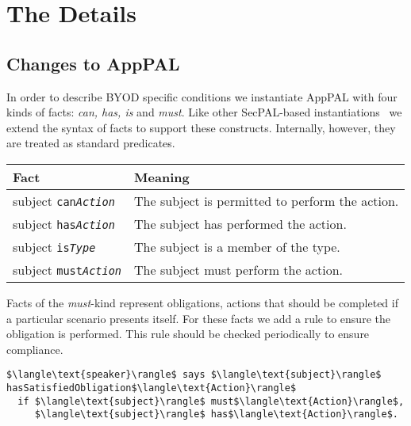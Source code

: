 \documentclass{article}
\begin{document}
\section{The Details}
\label{sec:details}

\subsection{Changes to AppPAL}

In order to describe BYOD specific conditions we instantiate AppPAL with four kinds of facts: \emph{can, has, is} and \emph{must}.
Like other SecPAL-based instantiations~\cite{becker_framework_2009,aziz_secpal4dsa:_2011} we extend the syntax of facts to support these constructs.
Internally, however, they are treated as standard predicates.

\begin{center}
  \footnotesize\sffamily
  \newcommand{\predicate}[3]{#1 \texttt{#2\textit{#3}}}
  \begin{tabular}{l l}
    \toprule
    Fact                              & Meaning                                         \\
    \midrule
    \predicate{subject}{can}{Action}  & The subject is permitted to perform the action. \\
    \predicate{subject}{has}{Action}  & The subject has performed the action.           \\
    \predicate{subject}{is}{Type}     & The subject is a member of the type.            \\
    \predicate{subject}{must}{Action} & The subject must perform the action.            \\
    \bottomrule
  \end{tabular}
\end{center}

Facts of the \emph{must}-kind represent obligations, actions that should be completed if a particular scenario presents itself.
For these facts we add a rule to ensure the obligation is performed.
This rule should be checked periodically to ensure compliance.
\begin{lstlisting}
$\langle\text{speaker}\rangle$ says $\langle\text{subject}\rangle$ hasSatisfiedObligation$\langle\text{Action}\rangle$
  if $\langle\text{subject}\rangle$ must$\langle\text{Action}\rangle$,
     $\langle\text{subject}\rangle$ has$\langle\text{Action}\rangle$.
\end{lstlisting}
\end{document}
